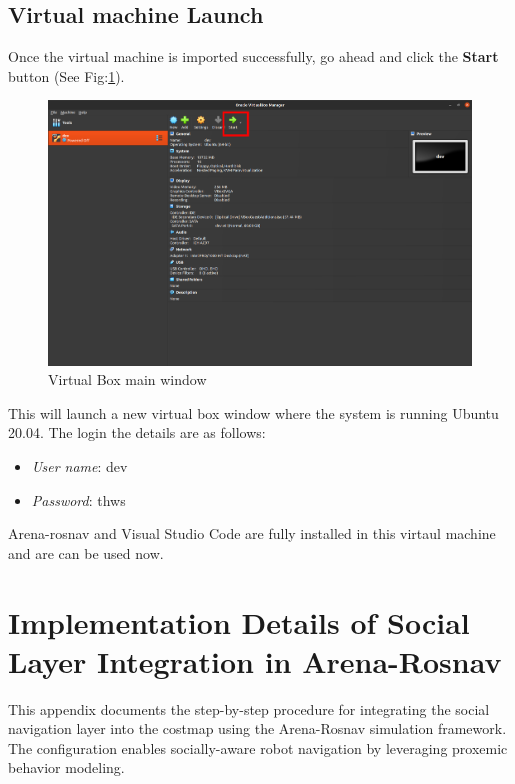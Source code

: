 \section{Virtual machine Launch}
Once the virtual machine is imported successfully, go ahead and click the \textbf{Start} button (See Fig:\ref{fig:main_window}). 
\begin{figure}[h]
    \centering
    \includegraphics[width=1.0\textwidth]{Figures/vm_launch.png}
    \caption{Virtual Box main window}
    \label{fig:main_window}
\end{figure}
This will launch a new virtual box window where the system is running Ubuntu 20.04. The login the details are as follows:
\begin{itemize}
    \item \textit{User name}: dev
    \item \textit{Password}: thws
\end{itemize}

\noindent Arena-rosnav and Visual Studio Code are fully installed in this virtaul machine and are can be used now.




\chapter{Implementation Details of Social Layer Integration in Arena-Rosnav}

\label{AppendixA} %

\label{appendix:social_layer}

This appendix documents the step-by-step procedure for integrating the social navigation layer into the costmap 
using the Arena-Rosnav simulation framework. The configuration enables socially-aware robot navigation by 
leveraging proxemic behavior modeling.

